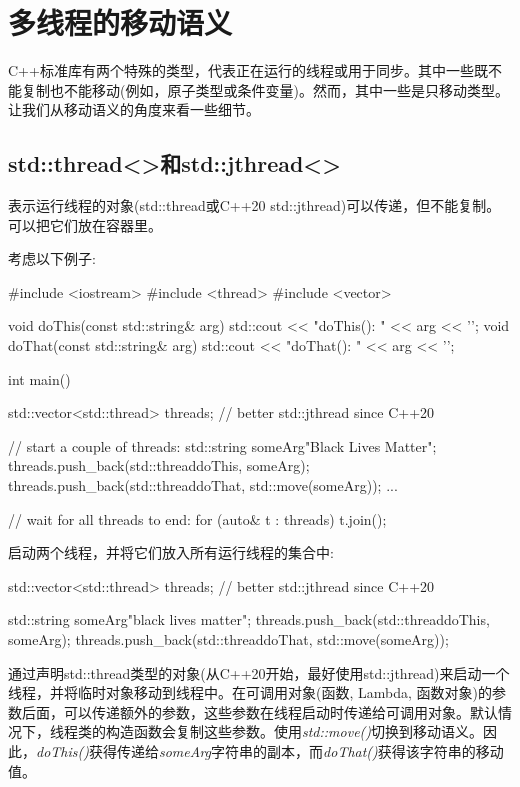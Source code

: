\section{多线程的移动语义}
C++标准库有两个特殊的类型，代表正在运行的线程或用于同步。其中一些既不能复制也不能移动(例如，原子类型或条件变量)。然而，其中一些是只移动类型。让我们从移动语义的角度来看一些细节。

\subsection{std::thread<>和std::jthread<>}

表示运行线程的对象(std::thread或C++20 std::jthread)可以传递，但不能复制。可以把它们放在容器里。

考虑以下例子:

\begin{cppcode}
#include <iostream>
#include <thread>
#include <vector>

void doThis(const std::string& arg) {
	std::cout << "doThis(): " << arg << '\n';
}
void doThat(const std::string& arg) {
	std::cout << "doThat(): " << arg << '\n';
}

int main()
{
	std::vector<std::thread> threads; // better std::jthread since C++20

	// start a couple of threads:
	std::string someArg{"Black Lives Matter"};
	threads.push_back(std::thread{doThis, someArg});
	threads.push_back(std::thread{doThat, std::move(someArg)});
	...

	// wait for all threads to end:
	for (auto& t : threads) {
		t.join();
	}
}
\end{cppcode}

启动两个线程，并将它们放入所有运行线程的集合中:

\begin{cppcode}
std::vector<std::thread> threads; // better std::jthread since C++20

std::string someArg{"black lives matter"};
threads.push_back(std::thread{doThis, someArg});
threads.push_back(std::thread{doThat, std::move(someArg)});
\end{cppcode}

通过声明std::thread类型的对象(从C++20开始，最好使用std::jthread)来启动一个线程，并将临时对象移动到线程中。在可调用对象(函数, Lambda, 函数对象)的参数后面，可以传递额外的参数，这些参数在线程启动时传递给可调用对象。默认情况下，线程类的构造函数会复制这些参数。使用\textit{std::move()}切换到移动语义。因此，\textit{doThis()}获得传递给\textit{someArg}字符串的副本，而\textit{doThat()}获得该字符串的移动值。


